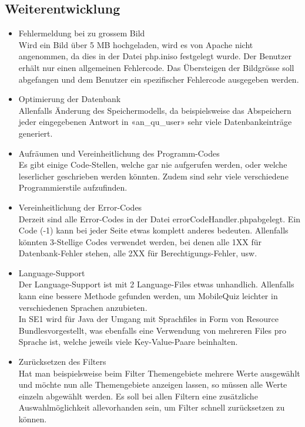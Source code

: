 \subsection{Weiterentwicklung}

\begin{itemize}
	\item Fehlermeldung bei zu grossem Bild\\
	Wird ein Bild über 5 MB  hochgeladen, wird es von Apache nicht angenommen, da dies in der Datei \glqq php.ini\grqq so festgelegt wurde. Der Benutzer erhält nur einen allgemeinen Fehlercode. Das Übersteigen der Bildgrösse soll abgefangen und dem Benutzer ein spezifischer Fehlercode ausgegeben werden.

	\item Optimierung der Datenbank\\
	Allenfalls Änderung des Speichermodells, da beispielsweise das Abspeichern jeder eingegebenen Antwort in «an\_qu\_user» sehr viele Datenbankeinträge generiert.

	\item Aufräumen und Vereinheitlichung des Programm-Codes\\
	Es gibt einige Code-Stellen, welche gar nie aufgerufen werden, oder welche leserlicher geschrieben werden könnten. Zudem sind sehr viele verschiedene Programmierstile aufzufinden.

	\item Vereinheitlichung der Error-Codes\\
	Derzeit sind alle Error-Codes in der Datei \glqq errorCodeHandler.php\grqq abgelegt. Ein Code (-1) kann bei jeder Seite etwas komplett anderes bedeuten. Allenfalls könnten 3-Stellige Codes verwendet werden, bei denen alle 1XX für Datenbank-Fehler stehen, alle 2XX für Berechtigungs-Fehler, usw.

	\item Language-Support\\
	Der Language-Support ist mit 2 Language-Files etwas unhandlich. Allenfalls kann eine bessere Methode gefunden werden, um MobileQuiz leichter in verschiedenen Sprachen anzubieten.\\
	In \acrfull{SE1} wird für Java der Umgang mit Sprachfiles in Form von \glqq Resource Bundles\grqq vorgestellt, was ebenfalls eine Verwendung von mehreren Files pro Sprache ist, welche jeweils viele Key-Value-Paare beinhalten.
	
	\item Zurücksetzen des Filters\\
	Hat man beispielsweise beim Filter Themengebiete mehrere Werte ausgewählt und möchte nun alle Themengebiete anzeigen lassen, so müssen alle Werte einzeln abgewählt werden. Es soll bei allen Filtern eine zusätzliche Auswahlmöglichkeit \glqq alle\grqq vorhanden sein, um Filter schnell zurücksetzen zu können.
	

\end{itemize}
